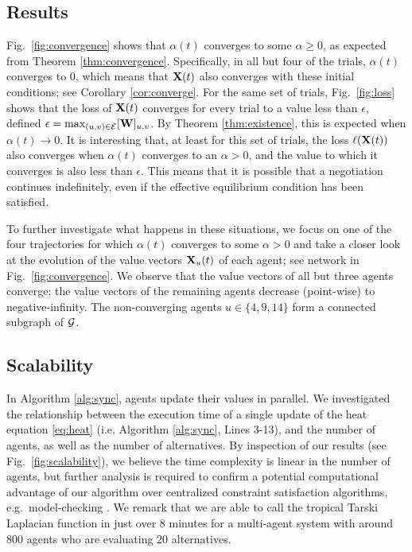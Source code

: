 \documentclass[letterpaper, 10 pt, conference]{ieeeconf}
\begin{document}
\subsection{Results}
Fig.~\ref{fig:convergence} shows that $\alpha(t)$ converges to some $\alpha \geq 0$, as expected  from Theorem \ref{thm:convergence}.
Specifically, in all but four of the trials, $\alpha(t)$ converges to $0$, which means that $\mathbf{X}(t)$ also converges with these initial conditions; see Corollary \ref{cor:converge}. For the same set of trials, Fig.~\ref{fig:loss} shows that the loss of $\mathbf{X}(t)$ converges for every trial to a value less than $\epsilon$, defined $\epsilon = \max_{(u,v) \in \mathcal{E}} [\mathbf{W}]_{u,v}$.
By Theorem \ref{thm:existence}, this is expected when $\alpha(t) \to 0$. It is interesting that, at least for this set of trials, the loss $\ell(\mathbf{X}(t))$ also converges when $\alpha(t)$ converges to an $\alpha>0$, and the value to which it converges is also less than $\epsilon$. This means that it is possible that a negotiation continues indefinitely, even if the effective equilibrium condition has been satisfied.

To further investigate what happens in these situations, we focus on one of the four trajectories for which $\alpha(t)$ converges to some $\alpha>0$ and take a closer look at the evolution of the value vectors $\mathbf{X}_u(t)$ of each agent; see network in Fig.~\ref{fig:convergence}. We observe that the value vectors of all but three agents converge; the value vectors of the remaining agents decrease (point-wise) to negative-infinity. The non-converging agents $u \in \{4,9,14\}$ form a connected subgraph of $\mathcal{G}$.

\subsection{Scalability}
In Algorithm \ref{alg:sync}, agents update their values in parallel. We investigated the relationship between the execution time of a single update of the heat equation \eqref{eq:heat} (i.e. Algorithm \ref{alg:sync}, Lines 3-13), and the number of agents, as well as the number of alternatives. By inspection of our results (see Fig.~\ref{fig:scalability}), we believe the time complexity is linear in the number of agents, but further analysis is required to confirm a potential computational advantage of our algorithm over centralized constraint satisfaction algorithms, e.g.~model-checking \cite{baier2008}. We remark that we are able to call the tropical Tarski Laplacian function in just over 8 minutes for a multi-agent system with around 800 agents who are evaluating 20 alternatives.
\end{document}
